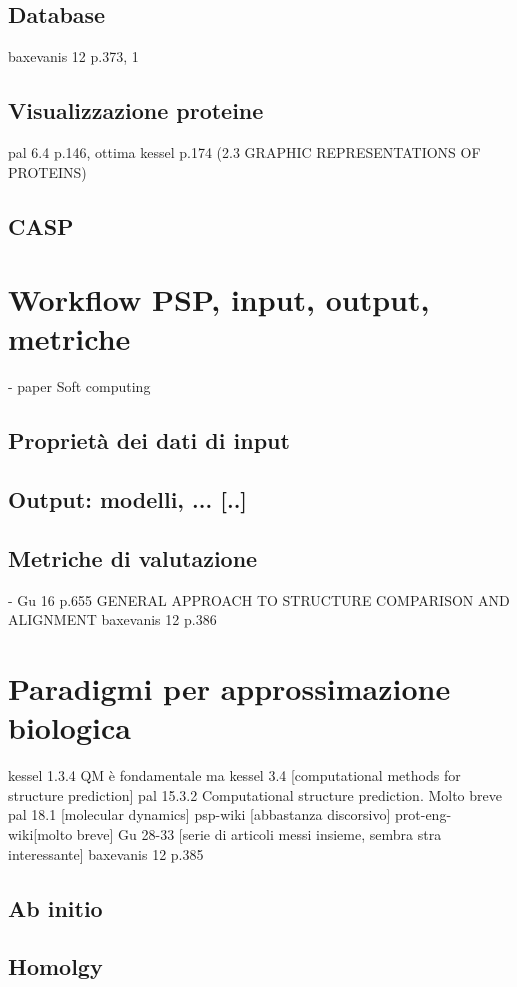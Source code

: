 \subsection{Database}
baxevanis 12 p.373, 1

\subsection{Visualizzazione proteine}
pal 6.4 p.146, ottima
kessel p.174 (2.3 GRAPHIC REPRESENTATIONS OF PROTEINS)
\subsection{CASP}

\section{Workflow PSP, input, output, metriche}
- paper Soft computing
\subsection{Proprietà dei dati di input}
\subsection{Output: modelli, ... [..]}
\subsection{Metriche di valutazione}
- Gu 16 p.655 GENERAL APPROACH TO STRUCTURE COMPARISON AND ALIGNMENT
baxevanis 12 p.386

\section{Paradigmi per approssimazione biologica}
kessel 1.3.4 QM è fondamentale ma 
kessel 3.4 [computational methods for structure prediction]
pal 15.3.2 Computational structure prediction. Molto breve
pal 18.1 [molecular dynamics]
psp-wiki [abbastanza discorsivo]
prot-eng-wiki[molto breve]
Gu 28-33 [serie di articoli messi insieme, sembra stra interessante]
baxevanis 12 p.385

\subsection{Ab initio}
\subsection{Homolgy}
